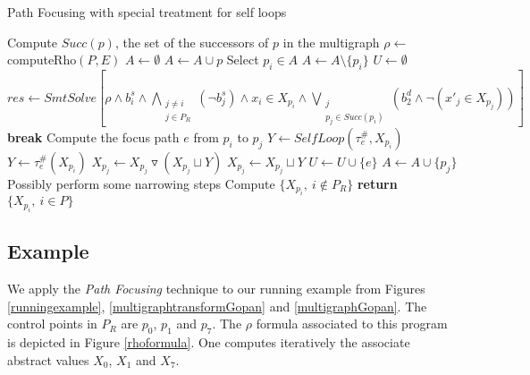 \documentclass[a4paper,english,titlepage,11pt]{report}
\newcommand{\widening}{\mathop{\triangledown}}
\begin{document}
\begin{algorithm}
\caption{Path Focusing with special treatment for self loops}
\label{pathfocusingoptalgo}
\begin{algorithmic}[1] 
	\State Compute $Succ(p)$, the set of the successors of $p$ in the multigraph
\EndFor
\State $\rho \gets$ computeRho$(P,E)$
\State $A \gets \emptyset$
	\State $A \gets A \cup p$
\EndFor
{}
	\State Select $p_i \in A$
	\State $A \gets A \setminus \{p_i\}$
	\State $U \gets \emptyset$
		\State $res \gets SmtSolve\left[\rho \wedge b_i^s \wedge
		\displaystyle\bigwedge_{\substack{j\neq i \\
		j\in P_R}} (\neg b_j^s) \wedge x_i \in X_{p_i} \wedge
		\bigvee_{\substack{j \\ p_j\in Succ(p_i)}} \left(b_2^d \wedge \neg (x'_j \in
		X_{p_j})\right)\right]$
			\State \textbf{break}
		\EndIf
		\State Compute the focus path $e$ from $p_i$ to $p_j$
			\State $Y \gets SelfLoop(\tau_e^\#,X_{p_i})$
		\Else
			\State $Y \gets \tau_e^\#(X_{p_i})$
		\EndIf
			\State $X_{p_j} \gets X_{p_j} \widening (X_{p_j} \sqcup Y)$
		\Else
			\State $X_{p_j} \gets X_{p_j} \sqcup Y$
			\State $U \gets U \cup \{e\}$
		\EndIf
		\State $A \gets A \cup \{p_j\}$
	\EndWhile
\EndWhile
\State Possibly perform some narrowing steps
\State Compute $\{X_{p_i},\ i \notin P_R\}$
\State \textbf{return} $\{X_{p_i},\ i \in P\}$
\EndProcedure
\end{algorithmic}
\end{algorithm}
	
	\subsection{Example}

	We apply the \emph{Path Focusing} technique to our running example from
	Figures \ref{runningexample}, \ref{multigraphtransformGopan} and
	\ref{multigraphGopan}.
	The control points in $P_R$ are $p_0$, $p_1$ and $p_7$. 
	The $\rho$ formula associated to this program is depicted in
	Figure \ref{rhoformula}.
	One computes
	iteratively the associate abstract values $X_0$, $X_1$ and $X_7$.
\end{document}
